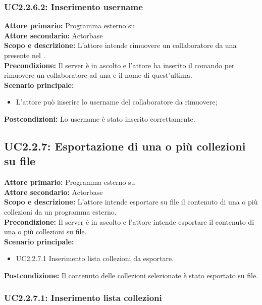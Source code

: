 \documentclass{scalatekids-article}
\begin{document}
\subsubsection{UC2.2.6.2: Inserimento username}

\textbf{Attore primario:} Programma esterno su \\
\textbf{Attore secondario:} Actorbase\\
\textbf{Scopo e descrizione:} L’attore intende rimuovere un collaboratore da una  presente nel .\\
\textbf{Precondizione:} Il server è in ascolto e l’attore ha inserito il comando per rimuovere un collaboratore ad una  e il nome di quest'ultima.\\
\textbf{Scenario principale:}
\begin{itemize}
\item L'attore può inserire lo username del collaboratore da rimuovere;
\end{itemize}
\textbf{Postcondizioni:} Lo username è stato inserito correttamente.

\subsection{UC2.2.7: Esportazione di una o più collezioni su file}

\textbf{Attore primario:} Programma esterno su \\
\textbf{Attore secondario:} Actorbase\\
\textbf{Scopo e descrizione:} L'attore intende esportare su file il contenuto di una o più collezioni da un programma  esterno.\\
\textbf{Precondizione:} Il server è in ascolto e l'attore intende esportare il contenuto di una o più collezioni su file.\\
\textbf{Scenario principale:}
\begin{itemize}
\item UC2.2.7.1 Inserimento lista collezioni da esportare.
\end{itemize}
\textbf{Postcondizione:} Il contenuto delle collezioni selezionate è stato esportato su file.

\subsubsection{UC2.2.7.1: Inserimento lista collezioni}
\end{document}
